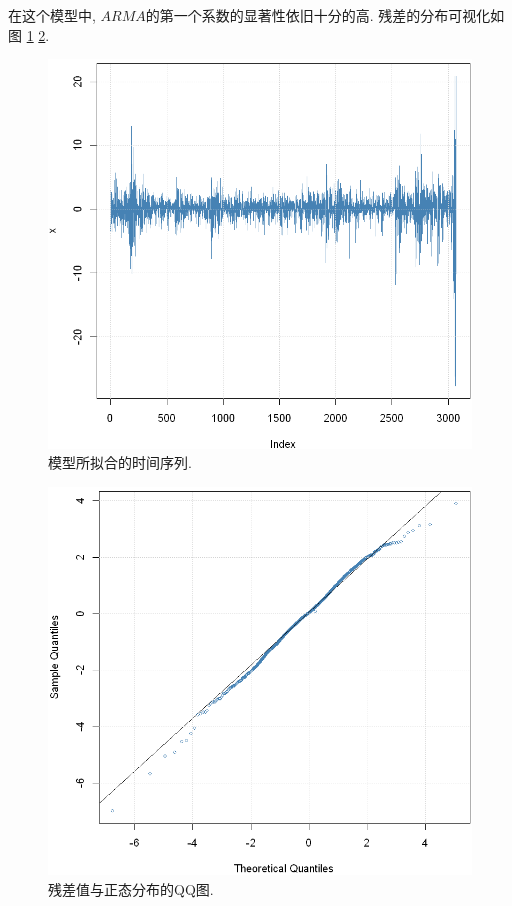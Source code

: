 \documentclass[11pt]{article}
\begin{document}
\qquad 在这个模型中, $ARMA$的第一个系数的显著性依旧十分的高. 残差的分布可视化如图 \ref{fig:17} \ref{fig:18}.
\begin{center}
    \hspace{30pt}\begin{minipage}{0.45\textwidth}
        \begin{figure}
            \centering
            \hspace{-25pt}\includegraphics[width=.9\textwidth]{output_52_0}
            \caption{模型所拟合的时间序列.\label{fig:17}}
        \end{figure}
    \end{minipage}
    \begin{minipage}{0.45\textwidth}
        \begin{figure}
            \centering
            \hspace{-25pt}\includegraphics[width=.9\textwidth]{output_53_0}
            \caption{残差值与正态分布的QQ图.\label{fig:18}}
        \end{figure}
    \end{minipage}
\end{center}
\end{document}

